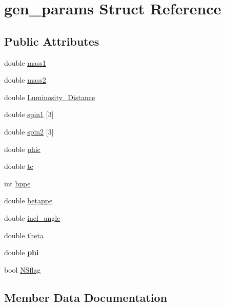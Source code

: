 \hypertarget{structgen__params}{}\section{gen\+\_\+params Struct Reference}
\label{structgen__params}
\subsection*{Public Attributes}
\begin{DoxyCompactItemize}
\item 
double \hyperlink{structgen__params_a61f517dacef76e1b86cc9025f4174e1d}{mass1}
\item 
double \hyperlink{structgen__params_a5df847d9918dac890a583e9c4e524f2f}{mass2}
\item 
double \hyperlink{structgen__params_a3acda7fc5d000217e487c364a08438b1}{Luminosity\+\_\+\+Distance}
\item 
double \hyperlink{structgen__params_a9df83898d1697de8f72c0f6f56d30437}{spin1} \mbox{[}3\mbox{]}
\item 
double \hyperlink{structgen__params_afac4e50653cee452ae08a3d203a2d97e}{spin2} \mbox{[}3\mbox{]}
\item 
double \hyperlink{structgen__params_a7330f71d30b868fccc393e985599b34a}{phic}
\item 
double \hyperlink{structgen__params_ac033c43dad8b5480a2d619e7b62ca1a5}{tc}
\item 
int \hyperlink{structgen__params_a2fd02506bbb8f372459a65622e6854e3}{bppe}
\item 
double \hyperlink{structgen__params_a4c1f1ab39fdf73c47b0c0e65dc3ba260}{betappe}
\item 
double \hyperlink{structgen__params_af07822f3c7c6f9c3abb38a7337ddf9a9}{incl\+\_\+angle}
\item 
double \hyperlink{structgen__params_a72da7de5a25ede0a8e168d70f596ee94}{theta}
\item 
\mbox{\label{structgen__params_a60e101ffbf40f4079af7e310dee7ae13}} 
double {\bfseries phi}
\item 
bool \hyperlink{structgen__params_a7a3195eaabdc7ebe4724333d38e6dcc7}{N\+Sflag}
\end{DoxyCompactItemize}


\subsection{Member Data Documentation}
\mbox{\label{structgen__params_a4c1f1ab39fdf73c47b0c0e65dc3ba260}} 
